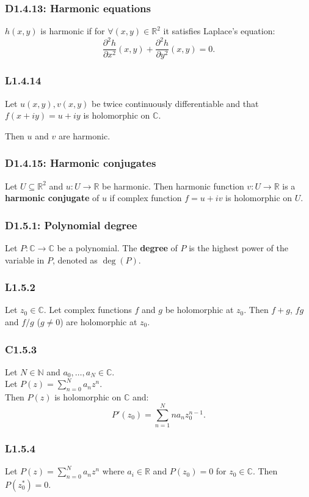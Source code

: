 \documentclass{article}
\begin{document}
\begin{multicols*}{3}
\subsubsection*{D1.4.13: Harmonic equations}
$h(x,y)$ is harmonic if for
$\forall(x,y)\in\mathbb{R}^2$ it satisfies Laplace's equation:
$$\frac{\partial^2h}{\partial x^2}(x,y)+
\frac{\partial^2h}{\partial y^2}(x,y)=0.$$

\subsubsection*{L1.4.14}
Let $u(x,y),v(x,y)$ be twice continuously differentiable
and that $f(x+iy)=u+iy$ is holomorphic on $\mathbb{C}$.

Then $u$ and $v$ are harmonic.

\subsubsection*{D1.4.15: Harmonic conjugates}
Let $U\subseteq\mathbb{R}^2$ and
$u:U\rightarrow\mathbb{R}$ be harmonic.
Then harmonic function $v:U\rightarrow\mathbb{R}$ is a
\textbf{harmonic conjugate} of $u$ if complex function
$f=u+iv$ is holomorphic on $U$.

\subsubsection*{D1.5.1: Polynomial degree}
Let $P:\mathbb{C}\rightarrow\mathbb{C}$ be a polynomial.
The \textbf{degree} of $P$ 
is the highest power of the variable in $P$,
denoted as $\deg(P)$.

\subsubsection*{L1.5.2}
Let $z_0\in\mathbb{C}$. Let complex functions $f$ and $g$ be
holomorphic at $z_0$. Then $f+g$, $fg$ and $f/g$ ($g\neq0$)
are holomorphic at $z_0$.

\subsubsection*{C1.5.3}
Let $N\in\mathbb{N}$ and $a_0,\dots,a_N\in\mathbb{C}$. \\
Let $\displaystyle P(z)=\sum_{n=0}^{N}a_n z^n$. \\
Then $P(z)$ is holomorphic on $\mathbb{C}$ and:
$$P'(z_0)=\sum_{n=1}^{N}na_n z_0^{n-1}.$$

\subsubsection*{L1.5.4}
Let $\displaystyle P(z)=\sum_{n=0}^{N}a_n z^n$ where $a_i\in\mathbb{R}$
and $P(z_0)=0$ for $z_0\in\mathbb{C}$.
Then $P(z^*_0)=0$.


\end{multicols*}
\end{document}
